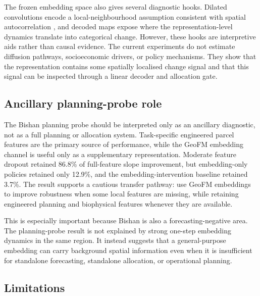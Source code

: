 \documentclass{article}
\begin{document}
The frozen embedding space also gives several diagnostic hooks. Dilated convolutions encode a local-neighbourhood assumption consistent with spatial autocorrelation \citep{tobler1970computer}, and decoded maps expose where the representation-level dynamics translate into categorical change. However, these hooks are interpretive aids rather than causal evidence. The current experiments do not estimate diffusion pathways, socioeconomic drivers, or policy mechanisms. They show that the representation contains some spatially localised change signal and that this signal can be inspected through a linear decoder and allocation gate.

\subsection{Ancillary planning-probe role}

The Bishan planning probe should be interpreted only as an ancillary diagnostic, not as a full planning or allocation system. Task-specific engineered parcel features are the primary source of performance, while the GeoFM embedding channel is useful only as a supplementary representation. Moderate feature dropout retained 86.8\% of full-feature slope improvement, but embedding-only policies retained only 12.9\%, and the embedding-intervention baseline retained 3.7\%. The result supports a cautious transfer pathway: use GeoFM embeddings to improve robustness when some local features are missing, while retaining engineered planning and biophysical features whenever they are available.

This is especially important because Bishan is also a forecasting-negative area. The planning-probe result is not explained by strong one-step embedding dynamics in the same region. It instead suggests that a general-purpose embedding can carry background spatial information even when it is insufficient for standalone forecasting, standalone allocation, or operational planning.

\subsection{Limitations}
\label{sec:limitations}
\end{document}
